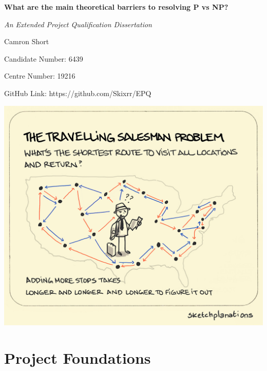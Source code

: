 \documentclass[12pt]{report}
\begin{document}
\begin{titlepage}
    \centering
    \vspace*{1cm}
    {\Huge\bfseries What are the main theoretical barriers to resolving P vs NP?\par}
    \vspace{1cm}
    {\Large\itshape An Extended Project Qualification Dissertation\par}
    \vspace{1cm}
    {\Large Camron Short\par}
    {\large Candidate Number: 6439\par}
    {\large Centre Number: 19216\par}
    {\small GitHub Link: https://github.com/Skixrr/EPQ\par}
    \vspace{0.7cm}
    \includegraphics[width=1\textwidth]{CoverPhoto.jpg}
    \thispagestyle{empty}
\end{titlepage}

\section*{Project Foundations}
\end{document}

